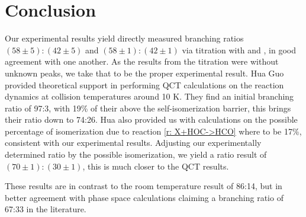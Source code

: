 
\section{Conclusion}

Our experimental results yield directly measured branching ratios $(58\pm5):(42\pm5)$ and $(58\pm1):(42\pm1)$ via titration with  and , in good agreement with one another. As the results from the  titration were without unknown peaks, we take that to be the proper experimental result. Hua Guo provided theoretical support in performing QCT calculations on the  reaction dynamics at collision temperatures around 10 K. They find an initial branching ratio of 97:3, with 19\% of their  above the self-isomerization barrier, this brings their ratio down to 74:26. Hua also provided us with calculations on the possible percentage of isomerization due to reaction \ref{r: X+HOC->HCO} where  to be 17\%, consistent with our experimental results. Adjusting our experimentally determined ratio by the possible isomerization, we yield a ratio result of $(70\pm1):(30\pm1)$, this is much closer to the QCT results.

These results are in contrast to the room temperature result of 86:14\cite{Love1987}, but in better agreement with phase space calculations claiming a branching ratio of 67:33 in the literature.\cite{DeFrees1984}